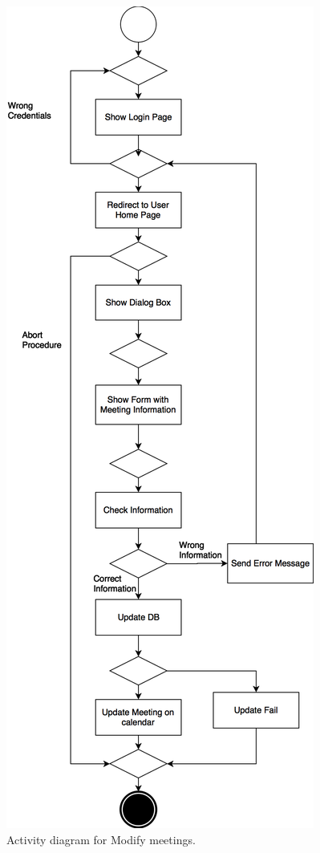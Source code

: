 \documentclass{article}
\begin{document}
	\begin{figure}[h!]
		\bigskip
		\centering
		\includegraphics[scale=0.25]{img/diagrams/modify_meetings_ad.png}
		\caption{Activity diagram for Modify meetings.}
	\end{figure}
\end{document}
